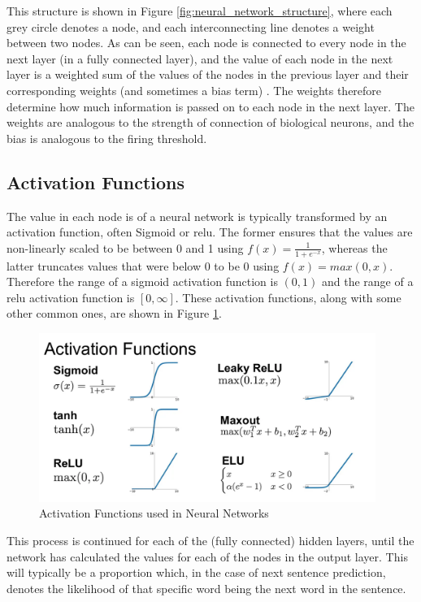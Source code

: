 This structure is shown in Figure \ref{fig:neural_network_structure}, where each grey circle denotes a node, and each interconnecting line denotes a weight between two nodes. As can be seen, each node is connected to every node in the next layer (in a fully connected layer), and the value of each node in the next layer is a weighted sum of the values of the nodes in the previous layer and their corresponding weights (and sometimes a bias term) \citep{Bishop}. The weights therefore determine how much information is passed on to each node in the next layer. The weights are analogous to the strength of connection of biological neurons, and the bias is analogous to the firing threshold.

\subsection{Activation Functions}
\label{sec:background_anns_activation_functions}

The value in each node is of a neural network is typically transformed by an activation function, often Sigmoid or \acrfull{relu}. The former ensures that the values are non-linearly scaled to be between 0 and 1 using $f(x) = \frac{1}{1+e^{-x}}$, whereas the latter truncates values that were below 0 to be 0 using $f(x) = max(0, x)$. Therefore the range of a sigmoid activation function is $(0, 1)$ and the range of a \acrshort{relu} activation function is $[0, \infty]$. These activation functions, along with some other common ones, are shown in Figure \ref{fig:activation_functions}.

\begin{figure}[h]
    \centering
    \includegraphics[height=5.5cm,trim={0 0 0 3.5cm},clip]{paper/images/activation_functions.png}
    \caption{Activation Functions used in Neural Networks \citep{Udofia}}
    \label{fig:activation_functions}
\end{figure}

This process is continued for each of the (fully connected) hidden layers, until the network has calculated the values for each of the nodes in the output layer. This will typically be a proportion which, in the case of next sentence prediction, denotes the likelihood of that specific word being the next word in the sentence.

